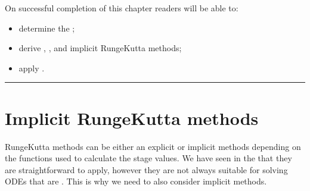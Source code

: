 \documentclass[letterpaper,10pt,english]{jupyterBook}
\begin{document}
\sphinxAtStartPar
On successful completion of this chapter readers will be able to:
\begin{itemize}
\item {} 
\sphinxAtStartPar
determine the {\hyperref[\detokenize{3_IRKs/3.0_IRKs:order-of-irk-section}]{}};

\item {} 
\sphinxAtStartPar
derive {\hyperref[\detokenize{3_IRKs/3.1_Deriving_IRK_methods:gauss-legendre-derivation}]{}}, {\hyperref[\detokenize{3_IRKs/3.1_Deriving_IRK_methods:radau-derivation}]{}}, {\hyperref[\detokenize{3_IRKs/3.1_Deriving_IRK_methods:dirk-derivation}]{}} and {\hyperref[\detokenize{3_IRKs/3.1_Deriving_IRK_methods:sdirk-derivation}]{}} implicit Runge\sphinxhyphen{}Kutta methods;

\item {} 
\sphinxAtStartPar
apply {\hyperref[\detokenize{3_IRKs/3.2_Solving_IVPs_using_IRK_methods:solving-ivps-using-irk-methods-section}]{}}.

\end{itemize}


\bigskip\hrule\bigskip



\section{Implicit Runge\sphinxhyphen{}Kutta methods}
\label{\detokenize{3_IRKs/3.0_IRKs:id1}}
\sphinxAtStartPar
Runge\sphinxhyphen{}Kutta methods can be either an explicit or implicit methods depending on the functions used to calculate the stage values. We have seen in the {\hyperref[\detokenize{2_ERKs/2.0_ERKs:erk-chapter}]{}} that they are straightforward to apply, however they are not always suitable for solving ODEs that are {\hyperref[\detokenize{4_Stability/4.0_Stability:stiffness-section}]{}}. This is why we need to also consider implicit methods.
\end{document}
